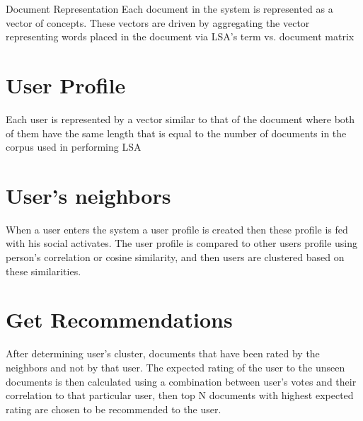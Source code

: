 {Document Representation}
Each document in the system is represented as a vector of concepts. These vectors are driven by aggregating the vector representing words placed in the document via LSA's term vs. document matrix 
\section{User Profile}
Each user is represented by a vector similar to that of the document where both of them have the same length that is equal to the number of documents in the corpus used in performing LSA
\section{User's neighbors}
When a user enters the system a user profile is created then these profile is fed with his social activates. The user profile is compared to other users profile using person's correlation or cosine similarity, and then users are clustered based on these similarities.
\section{Get Recommendations}
After determining user's cluster, documents that have been rated by the neighbors and not by that user. The expected rating of the user to the unseen documents is then calculated using a combination between user's votes and their correlation to that particular user, then top N documents with highest expected rating are chosen to be recommended to the user.

